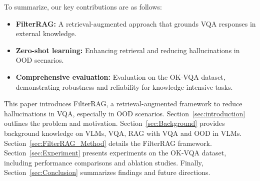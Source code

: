 To summarize, our key contributions are as follows:
\begin{itemize}
    \item \textbf{FilterRAG:} A retrieval-augmented approach that grounds VQA responses in external knowledge.
    
    \item \textbf{Zero-shot learning:} Enhancing retrieval and reducing hallucinations in OOD scenarios.
    
    \item \textbf{Comprehensive evaluation:} Evaluation on the OK-VQA dataset, demonstrating robustness and reliability for knowledge-intensive tasks.
\end{itemize}

This paper introduces FilterRAG, a retrieval-augmented framework to reduce hallucinations in VQA, especially in OOD scenarios. Section~\ref{sec:introduction} outlines the problem and motivation. Section~\ref{sec:Background} provides background knowledge on VLMs, VQA, RAG with VQA and OOD in VLMs. Section~\ref{sec:FilterRAG_Method} details the FilterRAG framework. Section~\ref{sec:Experiment} presents experiments on the OK-VQA dataset, including performance comparisons and ablation studies. Finally, Section~\ref{sec:Conclusion} summarizes findings and future directions.